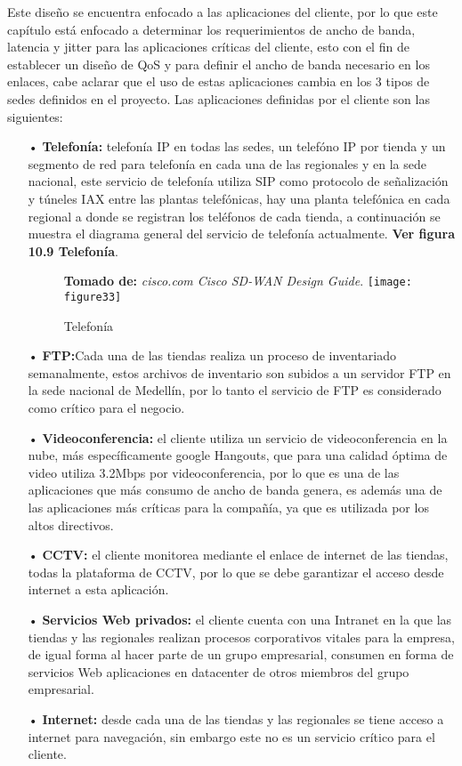 Este diseño se encuentra enfocado a las aplicaciones del cliente, por lo que este capítulo está enfocado a determinar los requerimientos de ancho de banda, latencia y jitter para las aplicaciones críticas del cliente, esto con el fin de establecer un diseño de QoS y para definir el ancho de banda necesario en los enlaces, cabe aclarar que el uso de estas aplicaciones cambia en los 3 tipos de sedes definidos en el proyecto. Las aplicaciones definidas por el cliente son las siguientes:
\begin{itemize}
\item[•]\textbf{Telefonía:} telefonía IP en todas las sedes, un telefóno IP por tienda y un segmento de red para telefonía en cada una de las regionales y en la sede nacional, este servicio de telefonía utiliza SIP como protocolo de señalización y túneles IAX entre las plantas telefónicas, hay una planta telefónica en cada regional a donde se registran los teléfonos de cada tienda, a continuación se muestra el diagrama general del servicio de telefonía actualmente. \textbf{Ver figura 10.9 Telefonía}.
\begin{figure}[htbp]
 \footnotesize{\textbf{Tomado de:} \textit{cisco.com Cisco SD-WAN Design Guide}.}
  \centering
    {\texttt{[image: figure33]}}%
  \caption{\footnotesize{Telefonía}}
  \label{fig:fig2subfig}
\end{figure}

\item[•]\textbf{FTP:}Cada una de las tiendas realiza un proceso de inventariado semanalmente, estos archivos de inventario son subidos a un servidor FTP en la sede nacional de Medellín, por lo tanto el servicio de FTP es considerado como crítico para el negocio.
\item[•]\textbf{Videoconferencia:} el cliente utiliza un servicio de videoconferencia en la nube, más específicamente google Hangouts, que para una calidad óptima de video utiliza 3.2Mbps por videoconferencia, por lo que es una de las aplicaciones que más consumo de ancho de banda genera, es además una de las aplicaciones más críticas para la compañía, ya que es utilizada por los altos directivos.
\item[•]\textbf{CCTV:} el cliente monitorea mediante el enlace de internet de las tiendas, todas la plataforma de CCTV, por lo que se debe garantizar el acceso desde internet a esta aplicación.
\item[•]\textbf{Servicios Web privados:} el cliente cuenta con una Intranet en la que las tiendas y las regionales realizan procesos corporativos vitales para la empresa, de igual forma al hacer parte de un grupo empresarial, consumen en forma de servicios Web aplicaciones en datacenter de otros miembros del grupo empresarial.
\item[•]\textbf{Internet:} desde cada una de las tiendas y las regionales se tiene acceso a internet para navegación, sin embargo este no es un servicio crítico para el cliente.


\end{itemize}
